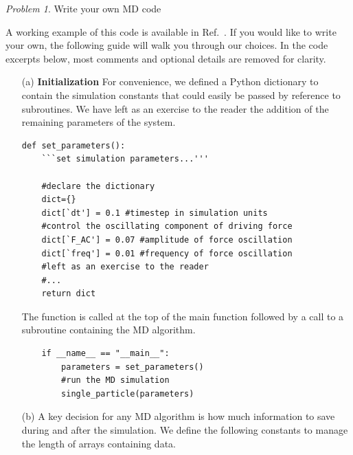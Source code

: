 \documentclass[preprint,showpacs,preprintnumbers,amsmath,amssymb,aps,prb]{revtex4-1}
\theoremstyle{remark}
\newtheorem{problem}{Problem}
\begin{document}
\begin{problem}{Write your own MD code}
  \label{ex:euler}

  A working example of this code is available
  in Ref.~\cite{supplemental}.
  If you would like to write your own,
  the following guide
  will walk you through our choices.
  In the code excerpts below,
  most comments and optional details are removed for clarity.
  
  \begin{enumerate}
    
  \item[(a)] {\bf Initialization}
    For convenience,
    we defined a Python dictionary
    to contain the simulation constants
    that could easily be passed by reference
    to subroutines.
    We have left as an exercise to the reader the addition
    of the remaining parameters of the system.
    \begin{verbatim}
def set_parameters():           
    ```set simulation parameters...'''

    #declare the dictionary     
    dict={}  
    dict[`dt'] = 0.1 #timestep in simulation units
    #control the oscillating component of driving force
    dict[`F_AC'] = 0.07 #amplitude of force oscillation
    dict[`freq'] = 0.01 #frequency of force oscillation
    #left as an exercise to the reader
    #...
    return dict

    \end{verbatim}

    The function is called at the top of the main function
    followed by a call to a subroutine
    containing the MD algorithm.

     \begin{verbatim}
    if __name__ == "__main__":
        parameters = set_parameters()
        #run the MD simulation
        single_particle(parameters)

\end{verbatim}

    
  \item[(b)]
    A key decision for any MD algorithm
    is how much information to save during and after
    the simulation.
    We define the following constants
    to manage the length of arrays
    containing data.
    

\end{enumerate}
\end{problem}
\end{document}
